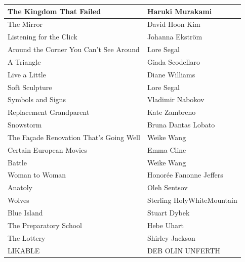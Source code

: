 \documentclass[11pt]{article}
\begin{document}
\begin{longtable}{l|l}
  The Kingdom That Failed                           & Haruki Murakami            \\ \hline
  The Mirror                                        & David Hoon Kim             \\ \hline
  Listening for the Click                           & Johanna Ekström            \\ \hline
  Around the Corner You Can’t See Around            & Lore Segal                 \\ \hline
  A Triangle                                        & Giada Scodellaro           \\ \hline
  Live a Little                                     & Diane Williams             \\ \hline
  Soft Sculpture                                    & Lore Segal                 \\ \hline
  Symbols and Signs                                 & Vladimir Nabokov           \\ \hline
  Replacement Grandparent                           & Kate Zambreno              \\ \hline
  Snowstorm                                         & Bruna Dantas Lobato        \\ \hline
  The Façade Renovation That’s Going Well           & Weike Wang                 \\ \hline
  Certain European Movies                           & Emma Cline                 \\ \hline
  Battle                                            & Weike Wang                 \\ \hline
  Woman to Woman                                    & Honorée Fanonne Jeffers    \\ \hline
  Anatoly                                           & Oleh Sentsov               \\ \hline
  Wolves                                            & Sterling HolyWhiteMountain \\ \hline
  Blue Island                                       & Stuart Dybek               \\ \hline
  The Preparatory School                            & Hebe Uhart                 \\ \hline
  The Lottery                                       & Shirley Jackson            \\ \hline
  LIKABLE                                           & DEB OLIN UNFERTH           \\ \hline

\end{longtable}
\end{document}
